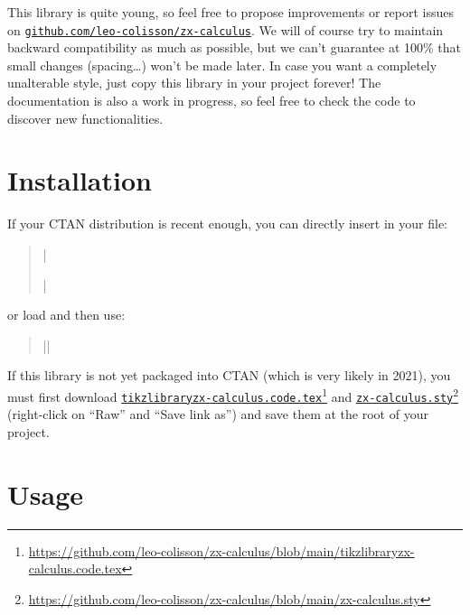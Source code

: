 \documentclass[a4paper]{ltxdoc}
\newcommand{\mylink}[2]{\href{#1}{#2}\footnote{\url{#1}}}
\begin{document}
This library is quite young, so feel free to propose improvements or report issues on \href{https://github.com/leo-colisson/zx-calculus}{\texttt{github.com/leo-colisson/zx-calculus}}. We will of course try to maintain backward compatibility as much as possible, but we can't guarantee at 100\% that small changes (spacing\dots{}) won't be made later. In case you want a completely unalterable style, just copy this library in your project forever! The documentation is also a work in progress, so feel free to check the code to discover new functionalities.

\section{Installation}

If your CTAN distribution is recent enough, you can directly insert in your file:
\begin{verse}
  |\usepackage{zx}|%
\end{verse}
or load \tikzname{} and then use:
\begin{verse}%
   |\usetikzlibrary{cd}|%
\end{verse}
If this library is not yet packaged into CTAN (which is very likely in 2021), you must first download \mylink{https://github.com/leo-colisson/zx-calculus/blob/main/tikzlibraryzx-calculus.code.tex}{\texttt{tikzlibraryzx-calculus.code.tex}} and \mylink{https://github.com/leo-colisson/zx-calculus/blob/main/zx-calculus.sty}{\texttt{zx-calculus.sty}} (right-click on ``Raw'' and ``Save link as'') and save them at the root of your project.

\section{Usage}
\end{document}
